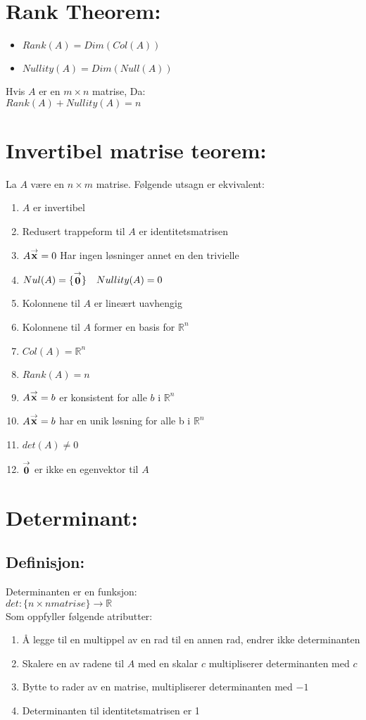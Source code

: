 \documentclass[12pt,a4paper,twocolumn,twoside]{article}
\def\real{\mathbb{R}}
\def\vector#1{\bold{\stackrel{\rightarrow}{#1}}}
\begin{document}
\section*{Rank Theorem:}
\begin{itemize}[topsep=0pt,itemsep=0pt, partopsep=0pt]
    \item $Rank(A) = Dim(Col(A))$
    \item $Nullity(A) = Dim(Null(A))$
\end{itemize}
Hvis $A$ er en $m \times n$ matrise, Da:\\ $Rank(A)+Nullity(A)=n$
\section*{Invertibel matrise teorem:}
La $A$ være en $n\times m$ matrise. Følgende utsagn er ekvivalent:
\begin{enumerate}[topsep=0pt,itemsep=0pt, partopsep=0pt]
    \item $A$ er invertibel
    \item Redusert trappeform til $A$ er identitetsmatrisen
    \item $A\vector{x}=0$ Har ingen løsninger annet en den trivielle
    \item $Nul(A) = \{\vector{0}\}\quad Nullity(A) = 0$
    \item Kolonnene til $A$ er lineært uavhengig
    \item Kolonnene til $A$ former en basis for $\real^n$
    \item $Col(A) = \real^n$
    \item $Rank(A)=n$
    \item $A\vector{x}=b$ er konsistent for alle $b$ i $\real^n$
    \item $A\vector{x}=b$ har en unik løsning for alle b i $\real^n$
    \item $det(A)\neq 0$
    \item $\vector{0}$ er ikke en egenvektor til $A$
\end{enumerate}
\section{Determinant:}
\subsection*{Definisjon:}
Determinanten er en funksjon:\\
$det:\{n\times n matrise\}\rightarrow \real$\\
Som oppfyller følgende atributter:
\begin{enumerate}[topsep=0pt,itemsep=0pt, partopsep=0pt]
    \item Å legge til en multippel av en rad til en annen rad, endrer ikke determinanten
    \item Skalere en av radene til $A$ med en skalar $c$ multipliserer determinanten med $c$
    \item Bytte to rader av en matrise, multipliserer determinanten med $-1$
    \item Determinanten til identitetsmatrisen er 1
\end{enumerate}
\end{document}
